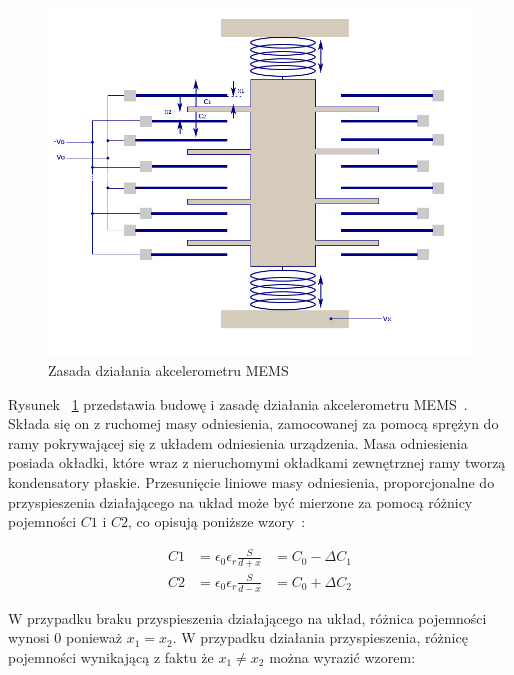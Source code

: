 \begin{figure}[H]
	\centering
	\includegraphics[scale=0.4]{Pictures/MEMS-Accelerometer_struct.png}
		\caption[Zasada działania akcelerometru MEMS]{Zasada działania akcelerometru MEMS}
	\label{fig:MEMS-Accelerometer_struct}
\end{figure}

Rysunek ~\ref{fig:MEMS-Accelerometer_struct} przedstawia budowę i zasadę działania akcelerometru MEMS~\cite{mems12, mems13}. Składa się on z ruchomej masy odniesienia, zamocowanej za pomocą sprężyn do ramy pokrywającej się z układem odniesienia urządzenia. Masa odniesienia posiada okładki, które wraz z nieruchomymi okładkami zewnętrznej ramy tworzą kondensatory płaskie. Przesunięcie liniowe masy odniesienia, proporcjonalne do przyspieszenia działającego na układ może być mierzone za pomocą różnicy pojemności $C1$ i $C2$, co opisują poniższe wzory~\cite{mems12}:

\begin{equation}
\begin{aligned}
C1 &= \epsilon_0\epsilon_r\frac{S}{d + x} &= C_0 - \Delta{C_1} \\
C2 &= \epsilon_0\epsilon_r\frac{S}{d - x} &= C_0 + \Delta{C_2}
\end{aligned}
\label{C_to_delta}
\end{equation} 

W przypadku braku przyspieszenia działającego na układ, różnica pojemności wynosi $0$ ponieważ $x_1 = x_2$. W przypadku działania przyspieszenia, różnicę pojemności wynikającą z faktu że $x_1 \neq x_2$ można wyrazić wzorem:

